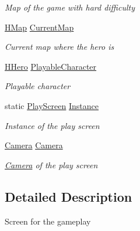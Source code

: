 \begin{DoxyCompactItemize}
\begin{DoxyCompactList}\small\item\em Map of the game with hard difficulty \end{DoxyCompactList}\item 
\hyperlink{class_hel_project_1_1_game_world_1_1_map_1_1_h_map}{H\+Map} \hyperlink{class_hel_project_1_1_u_i_1_1_play_screen_ad7c470e2c8f452c734ec3dc1fa6e3061}{Current\+Map}
\begin{DoxyCompactList}\small\item\em Current map where the hero is \end{DoxyCompactList}\item 
\hyperlink{class_hel_project_1_1_game_world_1_1_entities_1_1_h_hero}{H\+Hero} \hyperlink{class_hel_project_1_1_u_i_1_1_play_screen_a404ed230e991ee3a7563c23fc053f383}{Playable\+Character}
\begin{DoxyCompactList}\small\item\em Playable character \end{DoxyCompactList}\item 
static \hyperlink{class_hel_project_1_1_u_i_1_1_play_screen}{Play\+Screen} \hyperlink{class_hel_project_1_1_u_i_1_1_play_screen_a0611d9168457e37ecfd8a1758dc0f969}{Instance}
\begin{DoxyCompactList}\small\item\em Instance of the play screen \end{DoxyCompactList}\item 
\hyperlink{class_hel_project_1_1_u_i_1_1_camera}{Camera} \hyperlink{class_hel_project_1_1_u_i_1_1_play_screen_a1b972d98ea08568609caa80db4d22dd7}{Camera}
\begin{DoxyCompactList}\small\item\em \hyperlink{class_hel_project_1_1_u_i_1_1_camera}{Camera} of the play screen \end{DoxyCompactList}\end{DoxyCompactItemize}


\subsection{Detailed Description}
Screen for the gameplay 



